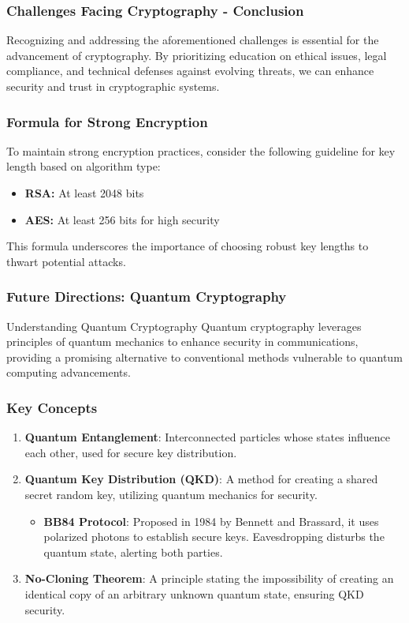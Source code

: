 \documentclass{beamer}
\begin{document}
\begin{frame}[fragile]
    \frametitle{Challenges Facing Cryptography - Conclusion}
    Recognizing and addressing the aforementioned challenges is essential for the advancement of cryptography. 
    By prioritizing education on ethical issues, legal compliance, and technical defenses against evolving threats, we can enhance security and trust in cryptographic systems.
\end{frame}

\begin{frame}[fragile]
    \frametitle{Formula for Strong Encryption}
    To maintain strong encryption practices, consider the following guideline for key length based on algorithm type:
    \begin{itemize}
        \item \textbf{RSA:} At least 2048 bits
        \item \textbf{AES:} At least 256 bits for high security
    \end{itemize}
    This formula underscores the importance of choosing robust key lengths to thwart potential attacks.
\end{frame}

\begin{frame}[fragile]
    \frametitle{Future Directions: Quantum Cryptography}
    \begin{block}{Understanding Quantum Cryptography}
        Quantum cryptography leverages principles of quantum mechanics to enhance security in communications, providing a promising alternative to conventional methods vulnerable to quantum computing advancements.
    \end{block}
\end{frame}

\begin{frame}[fragile]
    \frametitle{Key Concepts}
    \begin{enumerate}
        \item \textbf{Quantum Entanglement}: Interconnected particles whose states influence each other, used for secure key distribution.
        
        \item \textbf{Quantum Key Distribution (QKD)}: A method for creating a shared secret random key, utilizing quantum mechanics for security.
            \begin{itemize}
                \item \textbf{BB84 Protocol}: Proposed in 1984 by Bennett and Brassard, it uses polarized photons to establish secure keys. Eavesdropping disturbs the quantum state, alerting both parties.
            \end{itemize}
        
        \item \textbf{No-Cloning Theorem}: A principle stating the impossibility of creating an identical copy of an arbitrary unknown quantum state, ensuring QKD security.
    \end{enumerate}
\end{frame}
\end{document}
